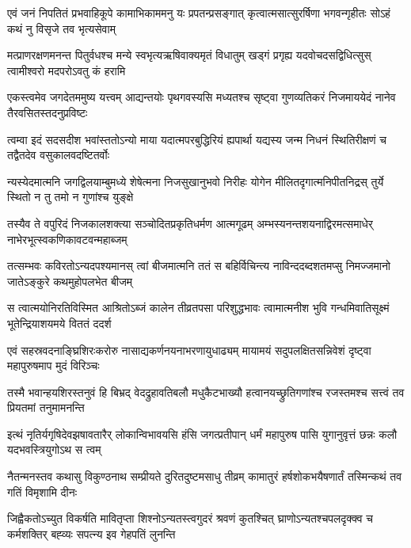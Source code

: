 \fourlineindentedshloka
{एवं जनं निपतितं प्रभवाहिकूपे}
{कामाभिकाममनु यः प्रपतन्प्रसङ्गात्}
{कृत्वात्मसात्सुरर्षिणा भगवन्गृहीतः}
{सोऽहं कथं नु विसृजे तव भृत्यसेवाम्} %

\fourlineindentedshloka
{मत्प्राणरक्षणमनन्त पितुर्वधश्च}
{मन्ये स्वभृत्यऋषिवाक्यमृतं विधातुम्}
{खड्गं प्रगृह्य यदवोचदसद्विधित्सुस्}
{त्वामीश्वरो मदपरोऽवतु कं हरामि} %

\fourlineindentedshloka
{एकस्त्वमेव जगदेतममुष्य यत्त्वम्}
{आद्यन्तयोः पृथगवस्यसि मध्यतश्च}
{सृष्ट्वा गुणव्यतिकरं निजमाययेदं}
{नानेव तैरवसितस्तदनुप्रविष्टः} %

\fourlineindentedshloka
{त्वम्वा इदं सदसदीश भवांस्ततोऽन्यो}
{माया यदात्मपरबुद्धिरियं ह्यपार्था}
{यद्यस्य जन्म निधनं स्थितिरीक्षणं च}
{तद्वैतदेव वसुकालवदष्टितर्वोः} %

\fourlineindentedshloka
{न्यस्येदमात्मनि जगद्विलयाम्बुमध्ये}
{शेषेत्मना निजसुखानुभवो निरीहः}
{योगेन मीलितदृगात्मनिपीतनिद्रस्}
{तुर्ये स्थितो न तु तमो न गुणांश्च युङ्क्षे} %

\fourlineindentedshloka
{तस्यैव ते वपुरिदं निजकालशक्त्या}
{सञ्चोदितप्रकृतिधर्मण आत्मगूढम्}
{अम्भस्यनन्तशयनाद्विरमत्समाधेर्}
{नाभेरभूत्स्वकणिकावटवन्महाब्जम्} %

\fourlineindentedshloka
{तत्सम्भवः कविरतोऽन्यदपश्यमानस्}
{त्वां बीजमात्मनि ततं स बहिर्विचिन्त्य}
{नाविन्ददब्दशतमप्सु निमज्जमानो}
{जातेऽङ्कुरे कथमुहोपलभेत बीजम्} %

\fourlineindentedshloka
{स त्वात्मयोनिरतिविस्मित आश्रितोऽब्जं}
{कालेन तीव्रतपसा परिशुद्धभावः}
{त्वामात्मनीश भुवि गन्धमिवातिसूक्ष्मं}
{भूतेन्द्रियाशयमये विततं ददर्श} %

\fourlineindentedshloka
{एवं सहस्रवदनाङ्घ्रिशिरःकरोरु}
{नासाद्यकर्णनयनाभरणायुधाढ्यम्}
{मायामयं सदुपलक्षितसन्निवेशं}
{दृष्ट्वा महापुरुषमाप मुदं विरिञ्चः} %

\fourlineindentedshloka
{तस्मै भवान्हयशिरस्तनुवं हि बिभ्रद्}
{वेदद्रुहावतिबलौ मधुकैटभाख्यौ}
{हत्वानयच्छ्रुतिगणांश्च रजस्तमश्च}
{सत्त्वं तव प्रियतमां तनुमामनन्ति} %

\fourlineindentedshloka
{इत्थं नृतिर्यगृषिदेवझषावतारैर्}
{लोकान्विभावयसि हंसि जगत्प्रतीपान्}
{धर्मं महापुरुष पासि युगानुवृत्तं}
{छन्नः कलौ यदभवस्त्रियुगोऽथ स त्वम्} %

\fourlineindentedshloka
{नैतन्मनस्तव कथासु विकुण्ठनाथ}
{सम्प्रीयते दुरितदुष्टमसाधु तीव्रम्}
{कामातुरं हर्षशोकभयैषणार्तं}
{तस्मिन्कथं तव गतिं विमृशामि दीनः} %

\fourlineindentedshloka
{जिह्वैकतोऽच्युत विकर्षति मावितृप्ता}
{शिश्नोऽन्यतस्त्वगुदरं श्रवणं कुतश्चित्}
{घ्राणोऽन्यतश्चपलदृक्क्व च कर्मशक्तिर्}
{बह्व्यः सपत्न्य इव गेहपतिं लुनन्ति} %

